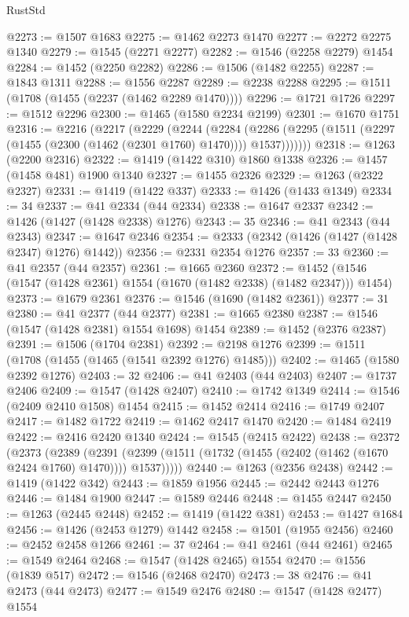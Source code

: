 \begin{lexlean}{RustStd}
\begin{coremodule}
{\begin{coremodule}
{{{{{{{{{{{{{{{{{{{{{{{{{{{{{{@2273 := @1507 @1683
@2275 := @1462 @2273 @1470
@2277 := @2272 @2275 @1340
@2279 := @1545 (@2271 @2277)
@2282 := @1546 (@2258 @2279) @1454
@2284 := @1452 (@2250 @2282)
@2286 := @1506 (@1482 @2255)
@2287 := @1843 @1311
@2288 := @1556 @2287
@2289 := @2238 @2288
@2295 := @1511 (@1708 (@1455 (@2237 (@1462 @2289 @1470))))
@2296 := @1721 @1726
@2297 := @1512 @2296
@2300 := @1465 (@1580 @2234 @2199)
@2301 := @1670 @1751
@2316 := @2216
    (@2217
      (@2229
        (@2244
          (@2284
            (@2286 (@2295 (@1511 (@2297 (@1455 (@2300 (@1462 (@2301 @1760) @1470)))) @1537)))))))
@2318 := @1263 (@2200 @2316)
@2322 := @1419 (@1422 @310) @1860 @1338
@2326 := @1457 (@1458 @481) @1900 @1340
@2327 := @1455 @2326
@2329 := @1263 (@2322 @2327)
@2331 := @1419 (@1422 @337)
@2333 := @1426 (@1433 @1349)
@2334 := 34
@2337 := @41 @2334 (@44 @2334)
@2338 := @1647 @2337
@2342 := @1426 (@1427 (@1428 @2338) @1276)
@2343 := 35
@2346 := @41 @2343 (@44 @2343)
@2347 := @1647 @2346
@2354 := @2333 (@2342 (@1426 (@1427 (@1428 @2347) @1276) @1442))
@2356 := @2331 @2354 @1276
@2357 := 33
@2360 := @41 @2357 (@44 @2357)
@2361 := @1665 @2360
@2372 := @1452 (@1546 (@1547 (@1428 @2361) @1554 (@1670 (@1482 @2338) (@1482 @2347))) @1454)
@2373 := @1679 @2361
@2376 := @1546 (@1690 (@1482 @2361))
@2377 := 31
@2380 := @41 @2377 (@44 @2377)
@2381 := @1665 @2380
@2387 := @1546 (@1547 (@1428 @2381) @1554 @1698) @1454
@2389 := @1452 (@2376 @2387)
@2391 := @1506 (@1704 @2381)
@2392 := @2198 @1276
@2399 := @1511 (@1708 (@1455 (@1465 (@1541 @2392 @1276) @1485)))
@2402 := @1465 (@1580 @2392 @1276)
@2403 := 32
@2406 := @41 @2403 (@44 @2403)
@2407 := @1737 @2406
@2409 := @1547 (@1428 @2407)
@2410 := @1742 @1349
@2414 := @1546 (@2409 @2410 @1508) @1454
@2415 := @1452 @2414
@2416 := @1749 @2407
@2417 := @1482 @1722
@2419 := @1462 @2417 @1470
@2420 := @1484 @2419
@2422 := @2416 @2420 @1340
@2424 := @1545 (@2415 @2422)
@2438 := @2372
    (@2373
      (@2389
        (@2391 (@2399 (@1511 (@1732 (@1455 (@2402 (@1462 (@1670 @2424 @1760) @1470)))) @1537)))))
@2440 := @1263 (@2356 @2438)
@2442 := @1419 (@1422 @342)
@2443 := @1859 @1956
@2445 := @2442 @2443 @1276
@2446 := @1484 @1900
@2447 := @1589 @2446
@2448 := @1455 @2447
@2450 := @1263 (@2445 @2448)
@2452 := @1419 (@1422 @381)
@2453 := @1427 @1684
@2456 := @1426 (@2453 @1279) @1442
@2458 := @1501 (@1955 @2456)
@2460 := @2452 @2458 @1266
@2461 := 37
@2464 := @41 @2461 (@44 @2461)
@2465 := @1549 @2464
@2468 := @1547 (@1428 @2465) @1554
@2470 := @1556 (@1839 @517)
@2472 := @1546 (@2468 @2470)
@2473 := 38
@2476 := @41 @2473 (@44 @2473)
@2477 := @1549 @2476
@2480 := @1547 (@1428 @2477) @1554
}}}}}}}}}}}}}}}}}}}}}}}}}}}}}}
\end{coremodule}}
\end{coremodule}
\end{lexlean}
